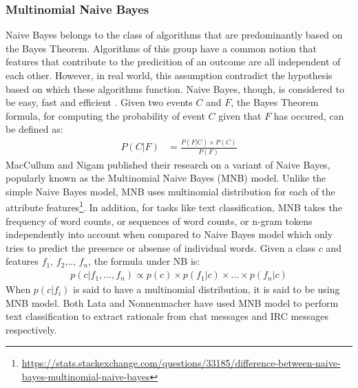 \documentclass[a4paper,12pt,twoside]{report}
\begin{document}
\subsubsection{Multinomial Naive Bayes}
Naive Bayes belongs to the class of algorithms that are predominantly based on the Bayes Theorem. Algorithms of this group have a common notion that features that contribute to the predicition of an outcome are all independent of each other. However, in real world, this assumption contradict the hypothesis based on which these algorithms function. Naive Bayes, though, is considered to be easy, fast and efficient \cite{Rennie2003}. 
\newline \newline
Given two events $C$ and $F$, the Bayes Theorem formula, for computing the probability of event $C$ given that $F$ has occured, can be defined as: 
\begin{align*}
P(C|F) &= \frac{P(F|C) \times P(C)}{P(F)}
\end{align*}
\newline
MacCullum and Nigam \cite{McCallum1998a} published their research on a variant of Naive Bayes, popularly known as the Multinomial Naive Bayes (\acs{MNB}) model. Unlike the simple Naive Bayes model, \acs{MNB} uses multinomial distribution for each of the attribute features\footnote{\url{https://stats.stackexchange.com/questions/33185/difference-between-naive-bayes-multinomial-naive-bayes}}. In addition, for tasks like text classification, \acs{MNB} takes the frequency of word counts, or sequences of word counts, or n-gram tokens independently into account when compared to Naive Bayes model which only tries to predict the presence or absense of individual words. 
\newline \newline
Given a class $c$ and features $f_1$, $f_2$,.., $f_n$, the formula under NB is:
\begin{align*}
p(c|f_1,...,f_n) \propto p(c) \times p(f_1|c) \times ... \times p(f_n|c)
\end{align*}
\newline \newline
When $p(c|f_i)$ is said to have a multinomial distribution, it is said to be using \acs{MNB} model.  
\newline \newline
Both Lata \cite{Lata2016} and Nonnenmacher\cite{Nonnenmacher2017} have used \acs{MNB} model to perform text classification to extract rationale from chat messages and \acs{IRC} messages respectively. 
\end{document}

